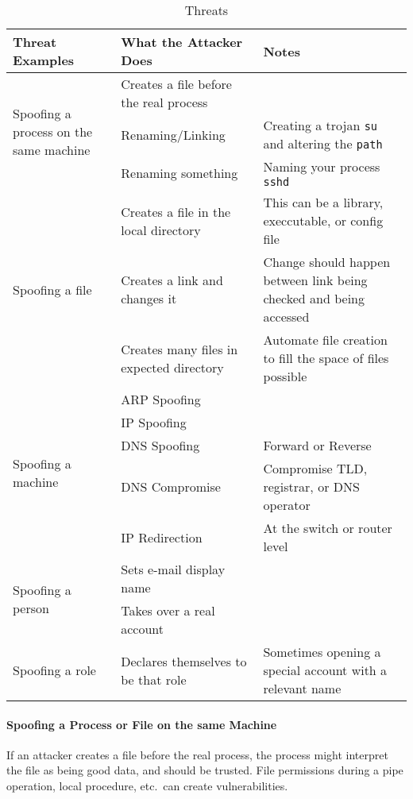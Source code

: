 \begin{table}[h!]
  \centering
  \begin{tabular}{p{5.7cm}p{5.7cm}p{5.7cm}}
    \toprule
    Threat Examples & What the Attacker Does & Notes \\
    \midrule
    \multirow{3}{5.7cm}{Spoofing a process on the same machine} & Creates a file before the real process & \\ \cline{2-3}
                    & Renaming/Linking & Creating a trojan \texttt{su} and altering the \texttt{path} \\ \cline{2-3}
                    & Renaming something & Naming your process \texttt{sshd} \\
    \midrule
    \multirow{3}{5.7cm}{Spoofing a file} & Creates a file in the local directory & This can be a library, execcutable, or config file \\ \cline{2-3}
                    & Creates a link and changes it & Change should happen between link being checked and being accessed \\ \cline{2-3}
                    & Creates many files in expected directory & Automate file creation to fill the space of files possible \\
    \midrule
    \multirow{5}{5.7cm}{Spoofing a machine} & ARP Spoofing & \\ \cline{2-3}
                    & IP Spoofing & \\ \cline{2-3}
                    & DNS Spoofing & Forward or Reverse \\ \cline{2-3}
                    & DNS Compromise & Compromise TLD, registrar, or DNS operator \\ \cline{2-3}
                    & IP Redirection & At the switch or router level \\
    \midrule
    \multirow{2}{5.7cm}{Spoofing a person} & Sets e-mail display name & \\ \cline{2-3}
                    & Takes over a real account & \\
    \midrule
    \multirow{1}{5.7cm}{Spoofing a role} & Declares themselves to be that role & Sometimes opening a special account with a relevant name \\
    \bottomrule
  \end{tabular}
  \caption{ Threats}
  \label{tab:Spoofing_Threats}
\end{table}

\paragraph{Spoofing a Process or File on the same Machine}\label{par:Spoofing_Process_File_Same_Machine}
If an attacker creates a file before the real process, the process might interpret the file as being good data, and should be trusted.
File permissions during a pipe operation, local procedure, etc.\ can create vulnerabilities.


